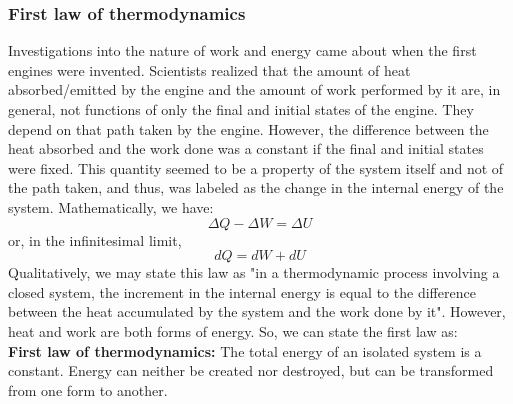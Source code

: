 \documentclass[letterpaper,10pt,english]{article}
\begin{document}
\subsubsection{First law of thermodynamics}
Investigations into the nature of work and energy came about when the first engines were invented. Scientists realized that the amount of heat absorbed/emitted by the engine and the amount of work performed by it are, in general, not functions of only the final and initial states of the engine. They depend on that path taken by the engine. However, the difference between the heat absorbed and the work done was a constant if the final and initial states were fixed. This quantity seemed to be a property of the system itself and not of the path taken, and thus, was labeled as the change in the internal energy of the system. Mathematically, we have:
\begin{equation*}
\Delta Q - \Delta W=\Delta U
\end{equation*}
or, in the infinitesimal limit, 
\begin{equation}
dQ=dW+dU
\end{equation}
Qualitatively, we may state this law as "in a thermodynamic process involving a closed system, the increment in the internal energy is equal to the difference between the heat accumulated by the system and the work done by it". However, heat and work are both forms of energy. So, we can state the first law as:\\
\textbf{First law of thermodynamics:} The total energy of an isolated system is a constant. Energy can neither be created nor destroyed, but can be transformed from one form to another. \\
\end{document}
